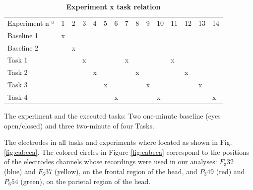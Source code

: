 \documentclass[10pt,letterpaper]{article}
\newlength\savedwidth
\newcommand\thickhline{\noalign{\global\savedwidth\arrayrulewidth\global\arrayrulewidth 2pt}%
\hline
\noalign{\global\arrayrulewidth\savedwidth}}
\begin{document}
\begin{table}[!ht]
  \centering
  \caption{
  {\bf Experiment x task relation}}

    \begin{tabular}{|l|l|l|l|l|l|l|l|l|l|l|l|l|l|l|}
    \hline
    Experiment n º & 1 & 2 & 3 & 4 & 5 & 6 & 7 & 8 & 9 & 10 & 11 & 12 & 13 & 14 \\ \thickhline
    Baseline 1     & x &   &   &   &   &   &   &   &   &    &    &    &    &    \\ \hline
    Baseline 2     &   & x &   &   &   &   &   &   &   &    &    &    &    &    \\ \hline
    Task 1         &   &   & x &   &   &   & x &   &   &    & x  &    &    &    \\ \hline
    Task 2         &   &   &   & x &   &   &   & x &   &    &    & x  &    &    \\ \hline
    Task 3         &   &   &   &   & x &   &   &   & x &    &    &    & x  &    \\ \hline
    Task 4         &   &   &   &   &   & x &   &   &   & x  &    &    &    & x  \\ \hline
    \end{tabular}

  \begin{flushleft} The experiment and the executed tasks: Two one-minute baseline (eyes open/closed) and three two-minute of four Tasks.
  \end{flushleft}
  \label{table1}
  \end{table}

The electrodes in all tasks and experiments where located as shown in Fig. \ref{fig:cabeca}. The colored circles in Figure \ref{fig:cabeca} correspond to the positions of the electrodes channels whose recordings were used in our analyses: \(F_{3}32\) (blue) and \(F_{6}37\) (yellow), on the frontal region of the head, and \(P_{3}49\) (red) and \(P_{6}54\) (green), on the parietal region of the head.
\end{document}
